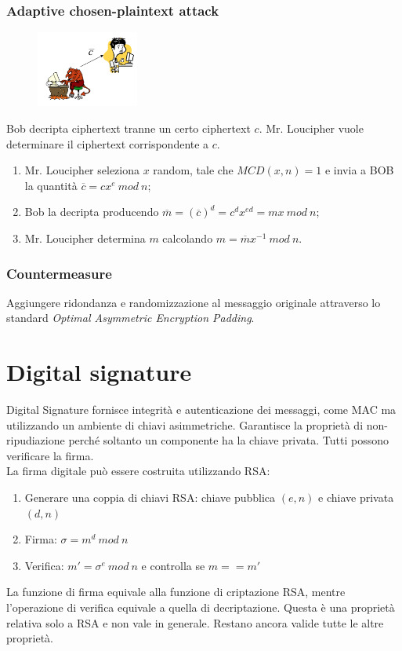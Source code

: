 \documentclass[a4paper,12pt]{article}
\begin{document}
\subsubsection{Adaptive chosen-plaintext attack}
\begin{figure}[H]
  \centering
  \includegraphics[width=0.3\textwidth]{img/chosen-ciphertext-attack}
\end{figure}
Bob decripta ciphertext tranne un certo ciphertext $c$. Mr. Loucipher vuole determinare il ciphertext corrispondente a $c$.
\begin{enumerate}
	\item Mr. Loucipher seleziona $x$ random, tale che $MCD(x, n) = 1$ e invia a BOB la quantità $\overline{c} = cx^e\ mod\ n$;
	\item Bob la decripta producendo $\overline{m} = (\overline{c})^d = c^d x^{ed} = mx\ mod\ n$;
	\item Mr. Loucipher determina $m$ calcolando $m = \overline{m} x^{-1}\ mod\ n$.
\end{enumerate} 

\subsubsection{Countermeasure}
Aggiungere ridondanza e randomizzazione al messaggio originale attraverso lo standard \textit{Optimal Asymmetric Encryption Padding}.

\newpage

\section{Digital signature}
Digital Signature fornisce integrità e autenticazione dei messaggi, come MAC ma utilizzando un ambiente di chiavi asimmetriche. Garantisce la proprietà di non-ripudiazione perché soltanto un componente ha la chiave privata.
Tutti possono verificare la firma. \\
La firma digitale può essere costruita utilizzando RSA:
\begin{enumerate}
	\item Generare una coppia di chiavi RSA: chiave pubblica $(e,n)$ e chiave privata $(d,n)$
	\item Firma: $\sigma = m^d\ mod\ n$
	\item Verifica: $m' = \sigma^e\ mod\ n$ e controlla se $m == m'$
\end{enumerate}
La funzione di firma equivale alla funzione di criptazione RSA, mentre l'operazione di verifica equivale a quella di decriptazione.
Questa è una proprietà relativa solo a RSA e non vale in generale. Restano ancora valide tutte le altre proprietà.
\end{document}
